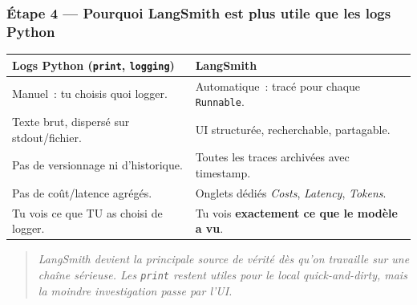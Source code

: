 \documentclass[11pt,a4paper]{article}
\begin{document}
\subsubsection*{Étape 4 — Pourquoi LangSmith est plus utile que les
logs Python}

\begin{center}
\begin{tabular}{p{6.5cm} p{6.5cm}}
\toprule
\textbf{Logs Python (\texttt{print}, \texttt{logging})} & \textbf{LangSmith} \\
\midrule
Manuel~: tu choisis quoi logger.
& Automatique~: tracé pour chaque \texttt{Runnable}. \\[1mm]
Texte brut, dispersé sur stdout/fichier.
& UI structurée, recherchable, partagable. \\[1mm]
Pas de versionnage ni d'historique.
& Toutes les traces archivées avec timestamp. \\[1mm]
Pas de coût/latence agrégés.
& Onglets dédiés \emph{Costs}, \emph{Latency}, \emph{Tokens}. \\[1mm]
Tu vois ce que TU as choisi de logger.
& Tu vois \textbf{exactement ce que le modèle a vu}. \\
\bottomrule
\end{tabular}
\end{center}

\begin{quote}\itshape
LangSmith devient la principale source de vérité dès qu'on travaille
sur une chaîne sérieuse. Les \texttt{print} restent utiles pour le
local quick-and-dirty, mais la moindre investigation passe par l'UI.
\end{quote}
\end{document}
